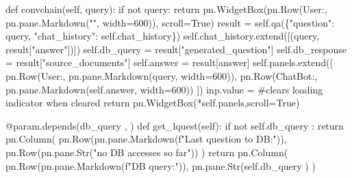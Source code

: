 \documentclass[
  letterpaper,
  DIV=11,
  numbers=noendperiod]{scrreprt}
\newenvironment{Shaded}{\begin{snugshade}}{\end{snugshade}}
\newcommand{\AttributeTok}[1]{\textcolor[rgb]{0.40,0.45,0.13}{#1}}
\newcommand{\CommentTok}[1]{\textcolor[rgb]{0.37,0.37,0.37}{#1}}
\newcommand{\ControlFlowTok}[1]{\textcolor[rgb]{0.00,0.23,0.31}{#1}}
\newcommand{\DecValTok}[1]{\textcolor[rgb]{0.68,0.00,0.00}{#1}}
\newcommand{\KeywordTok}[1]{\textcolor[rgb]{0.00,0.23,0.31}{#1}}
\newcommand{\NormalTok}[1]{\textcolor[rgb]{0.00,0.23,0.31}{#1}}
\newcommand{\OperatorTok}[1]{\textcolor[rgb]{0.37,0.37,0.37}{#1}}
\newcommand{\SpecialStringTok}[1]{\textcolor[rgb]{0.13,0.47,0.30}{#1}}
\newcommand{\StringTok}[1]{\textcolor[rgb]{0.13,0.47,0.30}{#1}}
\newcommand{\VariableTok}[1]{\textcolor[rgb]{0.07,0.07,0.07}{#1}}
\begin{document}
\begin{Shaded}
\begin{Highlighting}[]
    \KeywordTok{def}\NormalTok{ convchain(}\VariableTok{self}\NormalTok{, query):}
        \ControlFlowTok{if} \KeywordTok{not}\NormalTok{ query:}
            \ControlFlowTok{return}\NormalTok{ pn.WidgetBox(pn.Row(}\StringTok{\textquotesingle{}User:\textquotesingle{}}\NormalTok{, pn.pane.Markdown(}\StringTok{""}\NormalTok{, width}\OperatorTok{=}\DecValTok{600}\NormalTok{)), scroll}\OperatorTok{=}\VariableTok{True}\NormalTok{)}
\NormalTok{        result }\OperatorTok{=} \VariableTok{self}\NormalTok{.qa(\{}\StringTok{"question"}\NormalTok{: query, }\StringTok{"chat\_history"}\NormalTok{: }\VariableTok{self}\NormalTok{.chat\_history\})}
        \VariableTok{self}\NormalTok{.chat\_history.extend([(query, result[}\StringTok{"answer"}\NormalTok{])])}
        \VariableTok{self}\NormalTok{.db\_query }\OperatorTok{=}\NormalTok{ result[}\StringTok{"generated\_question"}\NormalTok{]}
        \VariableTok{self}\NormalTok{.db\_response }\OperatorTok{=}\NormalTok{ result[}\StringTok{"source\_documents"}\NormalTok{]}
        \VariableTok{self}\NormalTok{.answer }\OperatorTok{=}\NormalTok{ result[}\StringTok{\textquotesingle{}answer\textquotesingle{}}\NormalTok{]}
        \VariableTok{self}\NormalTok{.panels.extend([}
\NormalTok{            pn.Row(}\StringTok{\textquotesingle{}User:\textquotesingle{}}\NormalTok{, pn.pane.Markdown(query, width}\OperatorTok{=}\DecValTok{600}\NormalTok{)),}
\NormalTok{            pn.Row(}\StringTok{\textquotesingle{}ChatBot:\textquotesingle{}}\NormalTok{, pn.pane.Markdown(}\VariableTok{self}\NormalTok{.answer, width}\OperatorTok{=}\DecValTok{600}\NormalTok{))}
\NormalTok{        ])}
\NormalTok{        inp.value }\OperatorTok{=} \StringTok{\textquotesingle{}\textquotesingle{}}  \CommentTok{\#clears loading indicator when cleared}
        \ControlFlowTok{return}\NormalTok{ pn.WidgetBox(}\OperatorTok{*}\VariableTok{self}\NormalTok{.panels,scroll}\OperatorTok{=}\VariableTok{True}\NormalTok{)}

    \AttributeTok{@param.depends}\NormalTok{(}\StringTok{\textquotesingle{}db\_query \textquotesingle{}}\NormalTok{, )}
    \KeywordTok{def}\NormalTok{ get\_lquest(}\VariableTok{self}\NormalTok{):}
        \ControlFlowTok{if} \KeywordTok{not} \VariableTok{self}\NormalTok{.db\_query :}
            \ControlFlowTok{return}\NormalTok{ pn.Column(}
\NormalTok{                pn.Row(pn.pane.Markdown(}\SpecialStringTok{f"Last question to DB:"}\NormalTok{)),}
\NormalTok{                pn.Row(pn.pane.Str(}\StringTok{"no DB accesses so far"}\NormalTok{))}
\NormalTok{            )}
        \ControlFlowTok{return}\NormalTok{ pn.Column(}
\NormalTok{            pn.Row(pn.pane.Markdown(}\SpecialStringTok{f"DB query:"}\NormalTok{)),}
\NormalTok{            pn.pane.Str(}\VariableTok{self}\NormalTok{.db\_query )}
\NormalTok{        )}


\end{Highlighting}
\end{Shaded}
\end{document}
